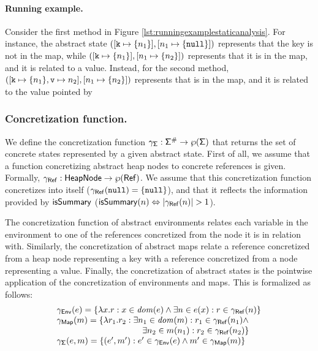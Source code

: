 \paragraph{Running example.} 
Consider the first method in Figure \ref{lst:runningexamplestaticanalysis}. For instance, the abstract state $([\mathtt{k} \mapsto \{n_1\}], [n_1 \mapsto \{\mathtt{null}\}])$ represents that the key  is not in the map, while $([\mathtt{k} \mapsto \{n_1\}], [n_1 \mapsto \{n_2\}])$ represents that it is in the map, and it is related to a value. Instead, for the second method, $([\mathtt{k} \mapsto \{n_1\}, \mathtt{v} \mapsto n_2], [n_1 \mapsto \{n_2\}])$ represents that  is in the map, and it is related to the value pointed by 

\subsubsection{Concretization function.}
We define the concretization function $\gamma_{\mathsf{\Sigma}} : \mathsf{\Sigma}^\# \to \wp(\mathsf{\Sigma})$ that returns the set of concrete states represented by a given abstract state. First of all, we assume that a function concretizing abstract heap nodes to concrete references is given. Formally, $\gamma_{\mathsf{Ref}} : \mathsf{HeapNode} \to \wp(\mathsf{Ref})$. We assume that this concretization function concretizes  into itself ($\gamma_{\mathsf{Ref}}(\mathtt{null})=\{\mathtt{null}\}$), and that it reflects the information provided by $\mathsf{isSummary}$ ($\isSummary(n) \Leftrightarrow |\gamma_\reference(n)|>1$).

The concretization function of abstract environments relates each variable in the environment to one of the references concretized from the node it is in relation with. Similarly, the concretization of abstract maps relate a reference concretized from a heap node representing a key with a reference concretized from a node representing a value. Finally, the concretization of abstract states is the pointwise application of the concretization of environments and maps. This is formalized as follows:
\[
\begin{array}{l}
\gamma_\env(e) = \{\lambda x . r : x \in \dom{e} \land \exists n \in e(x) : r \in \gamma_\reference(n)\}\\
\gamma_\map(m) = \{\lambda r_1 . r_2 : \exists n_1 \in \dom{m} : r_1 \in \gamma_\reference(n_1) \land\\
\hspace{100pt} \exists n_2 \in m(n_1) : r_2 \in \gamma_\reference(n_2) \}\\
\gamma_\state(e, m) = \{(e', m') : e' \in \gamma_\env(e) \land m' \in \gamma_\map(m)\}\\
\end{array}
\]

